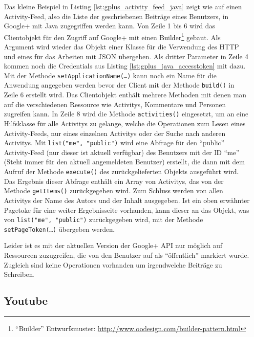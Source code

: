 Das kleine Beispiel in Listing \ref{lst:gplus_activity_feed_java} zeigt wie auf einen Activity-Feed, also die Liste der geschriebenen Beiträge eines Benutzers, in Google+ mit Java zugegriffen werden kann. Von Zeile 1 bis 6 wird das Clientobjekt für den Zugriff auf Google+ mit einen Builder\footnote{\enquote{Builder} Entwurfsmuster: \url{http://www.oodesign.com/builder-pattern.html}} gebaut. Als Argument wird wieder das Objekt einer Klasse für die Verwendung des HTTP und eines für das Arbeiten mit JSON übergeben. Als dritter Parameter in Zeile 4 kommen noch die Credentials aus Listing \ref{lst:gplus_java_accesstoken} mit dazu. Mit der Methode \texttt{setApplicationName(\dots)} kann noch ein Name für die Anwendung angegeben werden bevor der Client mit der Methode \texttt{build()} in Zeile 6 erstellt wird. Das Clientobjekt enthält mehrere Methoden mit denen man auf die verschiedenen Ressource wie Activitys, Kommentare und Personen zugreifen kann. In Zeile 8 wird die Methode \texttt{activities()} eingesetzt, um an eine Hilfsklasse für alle Activitys zu gelange, welche die Operationen zum Lesen eines Activity-Feeds, nur eines einzelnen Activitys oder der Suche nach anderen Activitys. Mit \texttt{list("me", "public")} wird eine Abfrage für den \enquote{public} Activity-Feed (nur dieser ist aktuell verfügbar) des Benutzers mit der ID \enquote{me} (Steht immer für den aktuell angemeldeten Benutzer) erstellt, die dann mit dem Aufruf der Methode \texttt{execute()} des zurückgelieferten Objekts ausgeführt wird. Das Ergebnis dieser Abfrage enthält ein Array von Activitys, das von der Methode \texttt{getItems()} zurückgegeben wird. Zum Schluss werden von allen Activitys der Name des Autors und der Inhalt ausgegeben. Ist ein oben erwähnter Pagetoke für eine weiter Ergebnisseite vorhanden, kann dieser an das Objekt, was von \texttt{list("me", "public")} zurückgegeben wird, mit der Methode \texttt{setPageToken(\dots)} übergeben werden.

Leider ist es mit der aktuellen Version der Google+ API nur möglich auf Ressourcen zuzugreifen, die von den Benutzer auf als \enquote{öffentlich} markiert wurde. Zugleich sind keine Operationen vorhanden um irgendwelche Beiträge zu Schreiben.



\subsection{Youtube} %
\label{sub:youtube_connector}

